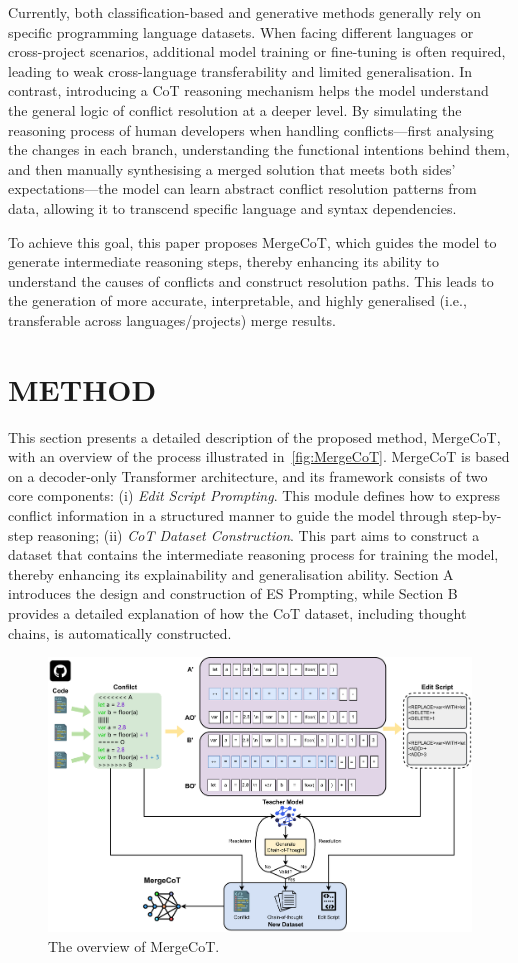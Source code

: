 \documentclass[sigconf,review,anonymous]{acmart}
\begin{document}
Currently, both classification-based and generative methods generally rely on specific programming language datasets. When facing different languages or cross-project scenarios, additional model training or fine-tuning is often required, leading to weak cross-language transferability and limited generalisation. 
In contrast, introducing a CoT reasoning mechanism helps the model understand the general logic of conflict resolution at a deeper level. By simulating the reasoning process of human developers when handling conflicts—first analysing the changes in each branch, understanding the functional intentions behind them, and then manually synthesising a merged solution that meets both sides’ expectations—the model can learn abstract conflict resolution patterns from data, allowing it to transcend specific language and syntax dependencies.

To achieve this goal, this paper proposes MergeCoT, which guides the model to generate intermediate reasoning steps, thereby enhancing its ability to understand the causes of conflicts and construct resolution paths. 
This leads to the generation of more accurate, interpretable, and highly generalised (i.e., transferable across languages/projects) merge results.

\section{METHOD}
This section presents a detailed description of the proposed method, MergeCoT, with an overview of the process illustrated in~\autoref{fig:MergeCoT}.
MergeCoT is based on a decoder-only Transformer architecture, and its framework consists of two core components: (i) \textit{Edit Script Prompting}. This module defines how to express conflict information in a structured manner to guide the model through step-by-step reasoning; (ii) \textit{CoT Dataset Construction}. This part aims to construct a dataset that contains the intermediate reasoning process for training the model, thereby enhancing its explainability and generalisation ability. Section A introduces the design and construction of ES Prompting, while Section B provides a detailed explanation of how the CoT dataset, including thought chains, is automatically constructed.
\begin{figure}[t]
    \centering
    \includegraphics[width=1\linewidth]{Figures/MergeCoT.pdf}
    \caption{The overview of MergeCoT.}
    \label{fig:MergeCoT}
\end{figure}
\end{document}

